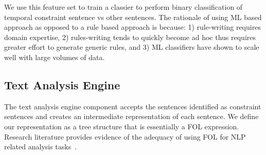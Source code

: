 We use this feature set to train a classier to perform binary classification of temporal constraint sentence vs other sentences. The rationale of using ML based approach as opposed to a rule based approach is because: 1) rule-writing requires domain expertise, 2) rules-writing tends to quickly become ad hoc thus requires greater effort to generate generic rules, and 3) ML classifiers have shown to scale well with large volumes of data.

 
%


\subsection{Text Analysis Engine}
\label{sub:TAE}




The text analysis engine component accepts the sentences identified as constraint sentences and creates an intermediate representation of each sentence.
We define our representation as a tree structure that is essentially a FOL expression.
Research literature provides evidence of the adequacy of using FOL for NLP related analysis tasks~\cite{Sinha2009,Sinha2010,pandita12:inferring, pandita13:WHYPER}.

